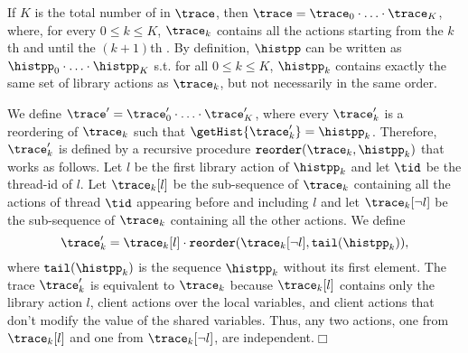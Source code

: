 If $K$ is the total number of {\shwrites} in $\trace$, then $\trace=\trace_0\cdot\ldots\cdot\trace_K$, where, for every $0\leq k\leq K$, $\trace_k$ contains all the actions starting from the $k$th {\shwrite} and until the $(k+1)$th {\shwrite}. 
By definition, $\histpp$ can be written as $\histpp_0\cdot \ldots\cdot \histpp_K$ s.t.
for all $0\leq k\leq K$, $\histpp_k$ contains exactly the same set of library actions as $\trace_k$, but not necessarily in the same order.

We define $\trace'=\trace'_0\cdot\ldots\cdot\trace'_K$, where every $\trace'_k$ is a reordering of $\trace_k$ such that $\getHist{\trace'_k}=\histpp_k$.
Therefore, $\trace'_k$ is defined by a recursive procedure ${\tt reorder}(\trace_k,\histpp_k)$ that works as follows.
Let $l$ be the first library action of $\histpp_k$ and let $\tid$ be the thread-id of $l$. Let $\trace_k[l]$ be the sub-sequence of $\trace_k$ containing all the actions of thread $\tid$ appearing before and including $l$ and let $\trace_k[{\neg l}]$ be the sub-sequence of $\trace_k$ containing all the other actions. We define 
\vspace{-1eX}
\[
\trace'_k=\trace_k[l]\cdot {\tt reorder}(\trace_k[{\neg l}],{\tt tail}(\histpp_k)),
\vspace{-1eX}
\]
where ${\tt tail}(\histpp_k)$ is the sequence $\histpp_k$ without its first element.
	The trace $\trace'_k$ is equivalent to $\trace_k$ because $\trace_k[l]$ contains only the library action $l$, client actions over the local variables, and client actions that don't modify the value of the shared variables. Thus, any two actions, one from $\trace_k[l]$ and one from $\trace_k[\neg l]$, are independent.\hfill$\Box$
